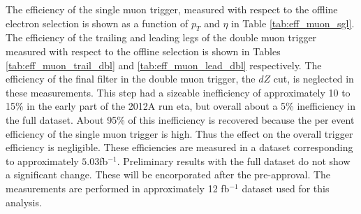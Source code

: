%
%

The efficiency of the single muon trigger, measured
with respect to the offline electron selection is shown
as a function of $p_T$ and $\eta$ in Table \ref{tab:eff_muon_sgl}.
The efficiency of the trailing and leading legs of the double muon trigger
measured with respect to the offline selection is shown
in Tables \ref{tab:eff_muon_trail_dbl} and \ref{tab:eff_muon_lead_dbl} respectively.
The efficiency of the final filter in the double muon trigger, the $dZ$ cut,
is neglected in these measurements.  This step had a sizeable inefficiency of
approximately 10 to 15\% in the early part of the 2012A run eta, but
overall about a 5\% inefficiency in the full dataset.
About 95\% of this inefficiency is recovered
because the per event efficiency of the single muon trigger is high.
Thus the effect on the overall trigger efficiency is negligible.
These efficiencies are measured in a dataset corresponding
to approximately $5.03$fb$^{-1}$.
Preliminary results with
the full dataset do not show a significant change. These will be encorporated
after the pre-approval.
The measurements are performed in approximately 12 fb$^{-1}$ dataset
used for this analysis.

